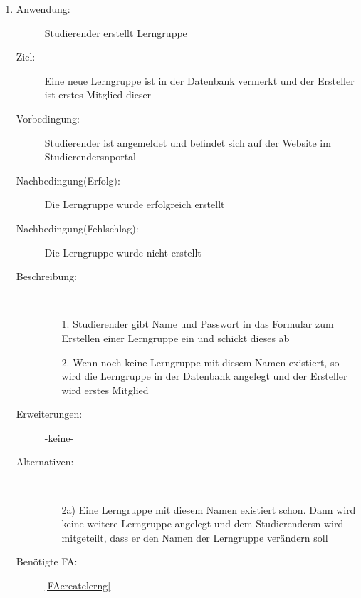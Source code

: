 \documentclass[parskip=full]{scrartcl}
\newcommand{\swtLabel}[1]{\textbf{/#1\arabic*0/}}
\begin{document}
\begin{enumerate}[label=\swtLabel{S}]
  
  \item \label{UCstudCrealernG}
  \begin{description}
  \item[Anwendung:] \gls{Studierender} erstellt \gls{Lerngruppe}
  \item[Ziel:] Eine neue \gls{Lerngruppe} ist in der Datenbank vermerkt und der
  Ersteller ist erstes Mitglied dieser
  	\item[Vorbedingung:] \gls{Studierender} ist angemeldet und befindet sich auf der
  	Website im \glspl{Studierender}nportal
  	\item[Nachbedingung(Erfolg):] Die \gls{Lerngruppe} wurde erfolgreich erstellt
  	\item[Nachbedingung(Fehlschlag):] Die \gls{Lerngruppe} wurde nicht erstellt
  	\item[Beschreibung:]~
  	\begin{enumerate}
  	  \item[1.] \gls{Studierender} gibt Name und Passwort in das Formular zum Erstellen
  	  einer \gls{Lerngruppe} ein und schickt dieses ab %
  	  \item[2.] Wenn noch keine \gls{Lerngruppe} mit diesem Namen existiert, so
  	  wird die \gls{Lerngruppe} in der Datenbank angelegt und der Ersteller wird
  	  erstes Mitglied
  	\end{enumerate}
  	\item[Erweiterungen:] -keine-
  	\item[Alternativen:] ~
  	\begin{enumerate}
  	  \item[2a)] Eine \gls{Lerngruppe} mit diesem Namen existiert schon. Dann
  	  wird keine weitere \gls{Lerngruppe} angelegt und dem \glspl{Studierender}n wird
  	  mitgeteilt, dass er den Namen der \gls{Lerngruppe} verändern soll
  	 \end{enumerate}
  	 \item[Benötigte FA:] \ref{FAcreatelerng}
  \end{description}
   

\end{enumerate}
\end{document}

